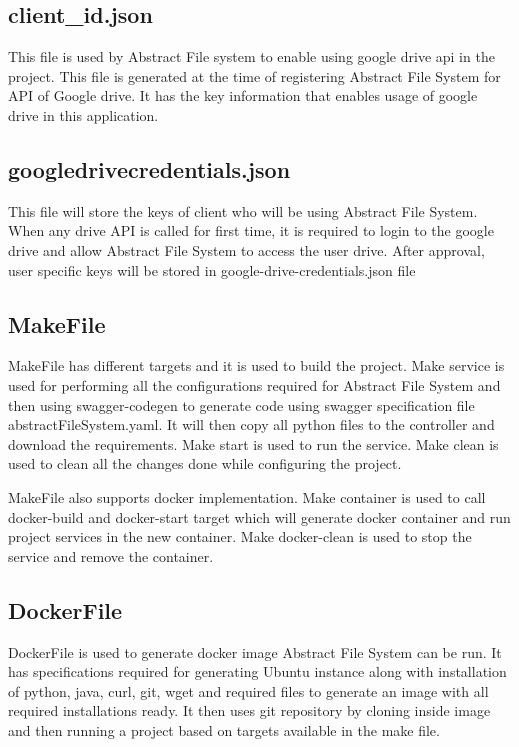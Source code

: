 \subsection{client\_id.json}
This file is used by Abstract File system to enable using google drive api in 
the project. This file is generated at the time of registering Abstract File 
System for API of Google drive. It has the key information that enables usage 
of google drive in this application. 

\subsection{google\-drive\-credentials.json}
This file will store the keys of client who will be using Abstract File 
System. When any drive API is called for first time, it is required to login 
to the google drive and allow Abstract File System to access the user drive. 
After approval, user specific keys will be stored in 
google-drive-credentials.json file

\subsection{MakeFile}
MakeFile has different targets and it is used to build the project. 
Make service is used for performing all the configurations required for 
Abstract File System and then using swagger-codegen to generate code using 
swagger specification file abstractFileSystem.yaml. It will then copy all 
python files to the controller and download the requirements. Make start is 
used to run the service. Make clean is used to clean all the changes done 
while configuring the project. 


MakeFile also supports docker implementation. Make container is used to call 
docker-build and docker-start target which will generate docker container and 
run project services in the new container. Make docker-clean is used to stop 
the service and remove the container. 

\subsection{DockerFile}
DockerFile is used to generate docker image Abstract File System can be run. 
It has specifications required for generating Ubuntu instance along with 
installation of python, java, curl, git, wget and required files to generate 
an image with all required installations ready. It then uses git repository by 
cloning inside image and then running a project based on targets available in 
the make file. 

